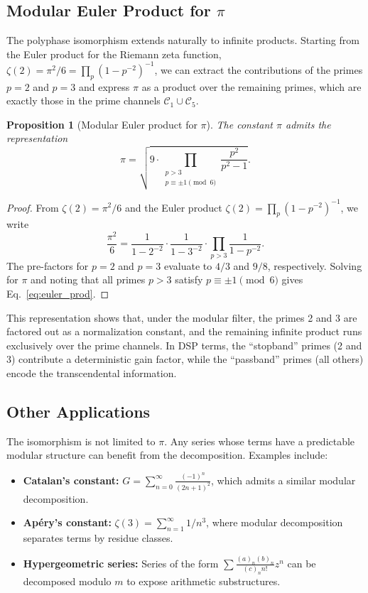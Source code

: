 \documentclass[12pt,a4paper]{article}
\theoremstyle{plain}
\newtheorem{proposition}[theorem]{Proposition}
\theoremstyle{definition}
\theoremstyle{remark}
\begin{document}
\subsection{Modular Euler Product for \(\pi\)}
The polyphase isomorphism extends naturally to infinite products. Starting from the Euler product for the Riemann zeta function, \(\zeta(2) = \pi^2/6 = \prod_p (1 - p^{-2})^{-1}\), we can extract the contributions of the primes \(p=2\) and \(p=3\) and express \(\pi\) as a product over the remaining primes, which are exactly those in the prime channels \(\mathcal{C}_1 \cup \mathcal{C}_5\).

\begin{proposition}[Modular Euler product for \(\pi\)]
\label{prop:euler}
The constant \(\pi\) admits the representation
\begin{equation}
\pi = \sqrt{9 \cdot \prod_{\substack{p > 3 \\ p \equiv \pm 1 \pmod{6}}} \frac{p^2}{p^2 - 1}}.
\label{eq:euler_prod}
\end{equation}
\end{proposition}

\begin{proof}
From \(\zeta(2) = \pi^2/6\) and the Euler product \(\zeta(2) = \prod_p (1 - p^{-2})^{-1}\), we write
\[
\frac{\pi^2}{6} = \frac{1}{1 - 2^{-2}} \cdot \frac{1}{1 - 3^{-2}} \cdot \prod_{p > 3} \frac{1}{1 - p^{-2}}.
\]
The pre-factors for \(p=2\) and \(p=3\) evaluate to \(4/3\) and \(9/8\), respectively. Solving for \(\pi\) and noting that all primes \(p>3\) satisfy \(p \equiv \pm 1 \pmod{6}\) gives Eq.~\eqref{eq:euler_prod}.
\end{proof}

This representation shows that, under the modular filter, the primes 2 and 3 are factored out as a normalization constant, and the remaining infinite product runs exclusively over the prime channels. In DSP terms, the ``stopband'' primes (2 and 3) contribute a deterministic gain factor, while the ``passband'' primes (all others) encode the transcendental information.

\subsection{Other Applications}
The isomorphism is not limited to \(\pi\). Any series whose terms have a predictable modular structure can benefit from the decomposition. Examples include:
\begin{itemize}
    \item \textbf{Catalan's constant:} \(G = \sum_{n=0}^{\infty} \frac{(-1)^n}{(2n+1)^2}\), which admits a similar modular decomposition.
    \item \textbf{Apéry's constant:} \(\zeta(3) = \sum_{n=1}^{\infty} 1/n^3\), where modular decomposition separates terms by residue classes.
    \item \textbf{Hypergeometric series:} Series of the form \(\sum \frac{(a)_n (b)_n}{(c)_n n!} z^n\) can be decomposed modulo \(m\) to expose arithmetic substructures.
\end{itemize}
\end{document}
